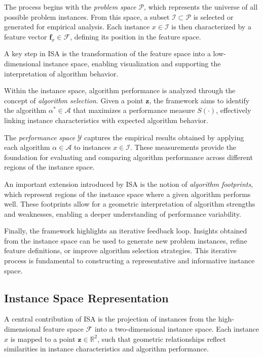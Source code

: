 \documentclass[12pt]{article}
\begin{document}
The process begins with the \textit{problem space} $\mathcal{P}$, which represents the universe of all possible problem instances. From this space, a subset $\mathcal{I} \subset \mathcal{P}$ is selected or generated for empirical analysis. Each instance $x \in \mathcal{I}$ is then characterized by a feature vector $\mathbf{f}_x \in \mathcal{F}$, defining its position in the feature space.

A key step in ISA is the transformation of the feature space into a low-dimensional instance space, enabling visualization and supporting the interpretation of algorithm behavior.

Within the instance space, algorithm performance is analyzed through the concept of \textit{algorithm selection}. Given a point $\mathbf{z}$, the framework aims to identify the algorithm $\alpha^* \in \mathcal{A}$ that maximizes a performance measure $S(\cdot)$, effectively linking instance characteristics with expected algorithm behavior.

The \textit{performance space} $\mathcal{Y}$ captures the empirical results obtained by applying each algorithm $\alpha \in \mathcal{A}$ to instances $x \in \mathcal{I}$. These measurements provide the foundation for evaluating and comparing algorithm performance across different regions of the instance space.

An important extension introduced by ISA is the notion of \textit{algorithm footprints}, which represent regions of the instance space where a given algorithm performs well. These footprints allow for a geometric interpretation of algorithm strengths and weaknesses, enabling a deeper understanding of performance variability.

Finally, the framework highlights an iterative feedback loop. Insights obtained from the instance space can be used to generate new problem instances, refine feature definitions, or improve algorithm selection strategies. This iterative process is fundamental to constructing a representative and informative instance space.

\subsection{Instance Space Representation}

A central contribution of ISA is the projection of instances from the high-dimensional feature space $\mathcal{F}$ into a two-dimensional instance space. Each instance $x$ is mapped to a point $\mathbf{z} \in \mathbb{R}^2$, such that geometric relationships reflect similarities in instance characteristics and algorithm performance.
\end{document}
